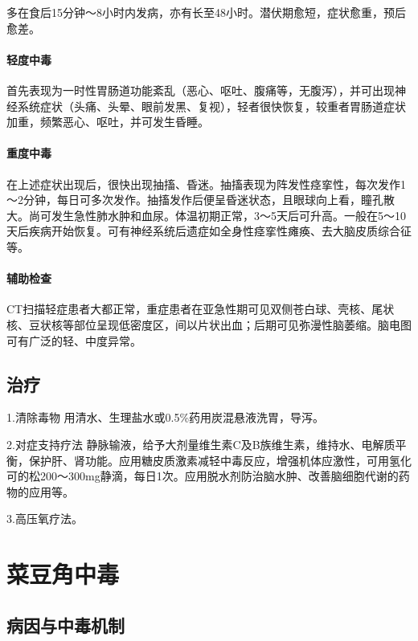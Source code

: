 多在食后15分钟～8小时内发病，亦有长至48小时。潜伏期愈短，症状愈重，预后愈差。

\paragraph{轻度中毒}

首先表现为一时性胃肠道功能紊乱（恶心、呕吐、腹痛等，无腹泻），并可出现神经系统症状（头痛、头晕、眼前发黑、复视），轻者很快恢复，较重者胃肠道症状加重，频繁恶心、呕吐，并可发生昏睡。

\paragraph{重度中毒}

在上述症状出现后，很快出现抽搐、昏迷。抽搐表现为阵发性痉挛性，每次发作1～2分钟，每日可多次发作。抽搐发作后便呈昏迷状态，且眼球向上看，瞳孔散大。尚可发生急性肺水肿和血尿。体温初期正常，3～5天后可升高。一般在5～10天后疾病开始恢复。可有神经系统后遗症如全身性痉挛性瘫痪、去大脑皮质综合征等。

\paragraph{辅助检查}

CT扫描轻症患者大都正常，重症患者在亚急性期可见双侧苍白球、壳核、尾状核、豆状核等部位呈现低密度区，间以片状出血；后期可见弥漫性脑萎缩。脑电图可有广泛的轻、中度异常。

\subsection{治疗}

1.清除毒物 用清水、生理盐水或0.5\%药用炭混悬液洗胃，导泻。

2.对症支持疗法
静脉输液，给予大剂量维生素C及B族维生素，维持水、电解质平衡，保护肝、肾功能。应用糖皮质激素减轻中毒反应，增强机体应激性，可用氢化可的松200～300mg静滴，每日1次。应用脱水剂防治脑水肿、改善脑细胞代谢的药物的应用等。

3.高压氧疗法。

\protect\hypertarget{text00167.html}{}{}

\section{菜豆角中毒}

\subsection{病因与中毒机制}

